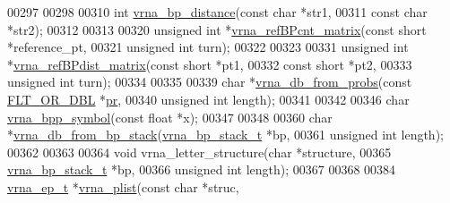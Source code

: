 \begin{DoxyCode}
00297 
00298 
00310 \textcolor{keywordtype}{int} \hyperlink{group__struct__utils_ga65bdfbac6a16bf30286e8a3f7d15f60a}{vrna\_bp\_distance}(\textcolor{keyword}{const} \textcolor{keywordtype}{char} *str1,
00311                      \textcolor{keyword}{const} \textcolor{keywordtype}{char} *str2);
00312 
00313 
00320 \textcolor{keywordtype}{unsigned} \textcolor{keywordtype}{int} *\hyperlink{group__struct__utils_gab4c2a00c99ce1d612ffa5bde114eb96d}{vrna\_refBPcnt\_matrix}(\textcolor{keyword}{const} \textcolor{keywordtype}{short}  *reference\_pt,
00321                                    \textcolor{keywordtype}{unsigned} \textcolor{keywordtype}{int} turn);
00322 
00323 
00331 \textcolor{keywordtype}{unsigned} \textcolor{keywordtype}{int} *\hyperlink{group__struct__utils_ga5a27bd058183170afd4716f5b8ff511a}{vrna\_refBPdist\_matrix}(\textcolor{keyword}{const} \textcolor{keywordtype}{short}   *pt1,
00332                                     \textcolor{keyword}{const} \textcolor{keywordtype}{short}   *pt2,
00333                                     \textcolor{keywordtype}{unsigned} \textcolor{keywordtype}{int}  turn);
00334 
00335 
00339 \textcolor{keywordtype}{char} *\hyperlink{group__struct__utils_ga0c28c410a5ab22d6ab9c77a84e8d5b44}{vrna\_db\_from\_probs}(\textcolor{keyword}{const} \hyperlink{group__data__structures_ga31125aeace516926bf7f251f759b6126}{FLT\_OR\_DBL} *\hyperlink{fold__vars_8h_ac98ec419070aee6831b44e5c700f090f}{pr},
00340                          \textcolor{keywordtype}{unsigned} \textcolor{keywordtype}{int}     length);
00341 
00342 
00346 \textcolor{keywordtype}{char} \hyperlink{group__struct__utils_ga025bff1b27fa46534c8fae6980f64bb5}{vrna\_bpp\_symbol}(\textcolor{keyword}{const} \textcolor{keywordtype}{float} *x);
00347 
00348 
00360 \textcolor{keywordtype}{char} *\hyperlink{group__struct__utils_ga27bea2c241564af53a065982183389df}{vrna\_db\_from\_bp\_stack}(\hyperlink{group__data__structures_structvrna__bp__stack__s}{vrna\_bp\_stack\_t} *bp,
00361                             \textcolor{keywordtype}{unsigned} \textcolor{keywordtype}{int}    length);
00362 
00363 
00364 \textcolor{keywordtype}{void} vrna\_letter\_structure(\textcolor{keywordtype}{char}             *structure,
00365                            \hyperlink{group__data__structures_structvrna__bp__stack__s}{vrna\_bp\_stack\_t}  *bp,
00366                            \textcolor{keywordtype}{unsigned} \textcolor{keywordtype}{int}     length);
00367 
00368 
00384 \hyperlink{group__struct__utils_structvrna__elem__prob__s}{vrna\_ep\_t} *\hyperlink{group__struct__utils_gaf002d69024d709744664a8b9ca3dd77d}{vrna\_plist}(\textcolor{keyword}{const} \textcolor{keywordtype}{char}  *struc,

\end{DoxyCode}
